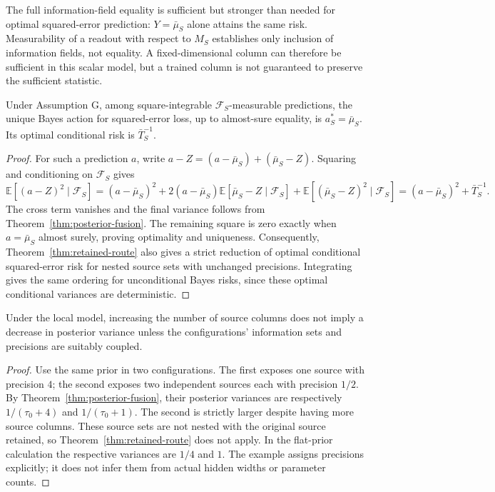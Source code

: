 The full information-field equality is sufficient but stronger than needed for optimal squared-error prediction: $Y=\bar\mu_S$ alone attains the same risk. Measurability of a readout with respect to $M_S$ establishes only inclusion of information fields, not equality. A fixed-dimensional column can therefore be sufficient in this scalar model, but a trained column is not guaranteed to preserve the sufficient statistic.

\begin{mosaictheorem}\label{thm:bayes-risk}
Under Assumption G, among square-integrable $\mathcal{F}_S$-measurable predictions, the unique Bayes action for squared-error loss, up to almost-sure equality, is $a_S^*=\bar\mu_S$. Its optimal conditional risk is $\bar T_S^{-1}$.
\end{mosaictheorem}
\begin{proof}
For such a prediction $a$, write $a-Z=(a-\bar\mu_S)+(\bar\mu_S-Z)$. Squaring and conditioning on $\mathcal{F}_S$ gives
\begin{equation}
\mathbb{E}[(a-Z)^2\mid\mathcal{F}_S]
=(a-\bar\mu_S)^2+2(a-\bar\mu_S)\mathbb{E}[\bar\mu_S-Z\mid\mathcal{F}_S]
+\mathbb{E}[(\bar\mu_S-Z)^2\mid\mathcal{F}_S]
=(a-\bar\mu_S)^2+\bar T_S^{-1}.
\end{equation}
The cross term vanishes and the final variance follows from Theorem~\ref{thm:posterior-fusion}. The remaining square is zero exactly when $a=\bar\mu_S$ almost surely, proving optimality and uniqueness. Consequently, Theorem~\ref{thm:retained-route} also gives a strict reduction of optimal conditional squared-error risk for nested source sets with unchanged precisions. Integrating gives the same ordering for unconditional Bayes risks, since these optimal conditional variances are deterministic.
\end{proof}

\begin{mosaicproposition}\label{prop:column-count}
Under the local model, increasing the number of source columns does not imply a decrease in posterior variance unless the configurations' information sets and precisions are suitably coupled.
\end{mosaicproposition}
\begin{proof}
Use the same prior in two configurations. The first exposes one source with precision $4$; the second exposes two independent sources each with precision $1/2$. By Theorem~\ref{thm:posterior-fusion}, their posterior variances are respectively $1/(\tau_0+4)$ and $1/(\tau_0+1)$. The second is strictly larger despite having more source columns. These source sets are not nested with the original source retained, so Theorem~\ref{thm:retained-route} does not apply. In the flat-prior calculation the respective variances are $1/4$ and $1$. The example assigns precisions explicitly; it does not infer them from actual hidden widths or parameter counts.
\end{proof}


